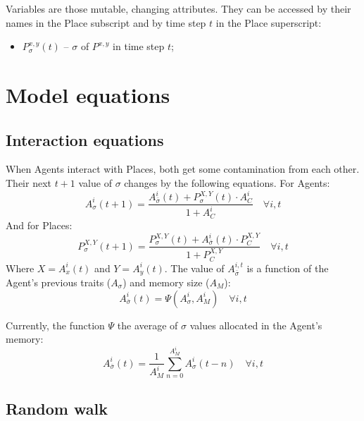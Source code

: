\documentclass{article}
\begin{document}
\par Variables are those mutable, changing attributes. They can be accessed by their names in the Place subscript and by time step $t$ in the Place superscript: 

\begin{itemize}
    \item $P^{x,y}_{\sigma}(t)$ -- $\sigma$ of $P^{x,y}$ in time step $t$;
\end{itemize}

\section{Model equations}

\subsection{Interaction equations}

\par When Agents interact with Places, both get some contamination from each other. Their next $t+1$ value of $\sigma$ changes by the following equations. For Agents:  
\begin{equation}
    A^{i}_{\sigma}(t + 1) = \frac{A^{i}_{\bar{\sigma}}(t) + P^{X,Y}_{\sigma}(t) \cdot A^{i}_{C}}{1 + A^{i}_{C}} \quad \forall i, t
\end{equation}
And for Places:
\begin{equation}
    P^{X,Y}_{\sigma}(t + 1) = \frac{P^{X,Y}_{\sigma}(t) + A^{i}_{\bar{\sigma}}(t)\cdot P^{X,Y}_{C}}{1 + P^{X,Y}_{C}} \quad \forall i, t
\end{equation}
Where $X = A^{i}_{x}(t)$ and $Y = A^{i}_{y}(t)$. The value of $A^{i, t}_{\bar{\sigma}}$ is a function of the Agent's previous traits ($A_{\sigma}$) and memory size ($A_M$):
\begin{equation}
    A^{i}_{\bar{\sigma}}(t) = \Psi(A^{i}_{\sigma}, A^{i}_{M}) \quad \forall i, t
\end{equation}

Currently, the function $\Psi$ the average of $\sigma$ values allocated in the Agent's memory:
\begin{equation}
    A^{i}_{\bar{\sigma}}(t) = \frac{1}{A^{i}_{M}} \sum_{n=0}^{A^{i}_{M}} A^{i}_{\sigma}(t - n) \quad \forall i, t
\end{equation}

\subsection{Random walk}
\end{document}
